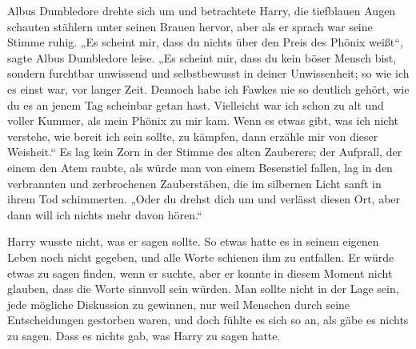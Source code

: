 Albus Dumbledore drehte sich um und betrachtete Harry, die tiefblauen Augen schauten stählern unter seinen Brauen hervor, aber als er sprach war seine Stimme ruhig. „Es scheint mir, dass du nichts über den Preis des Phönix weißt“, sagte Albus Dumbledore leise. „Es scheint mir, dass du kein böser Mensch bist, sondern furchtbar unwissend und selbstbewusst in deiner Unwissenheit; so wie ich es einst war, vor langer Zeit. Dennoch habe ich Fawkes nie so deutlich gehört, wie du es an jenem Tag scheinbar getan hast. Vielleicht war ich schon zu alt und voller Kummer, als mein Phönix zu mir kam. Wenn es etwas gibt, was ich nicht verstehe, wie bereit ich sein sollte, zu kämpfen, dann erzähle mir von dieser Weisheit.“ Es lag kein Zorn in der Stimme des alten Zauberers; der Aufprall, der einem den Atem raubte, als würde man von einem Besenstiel fallen, lag in den verbrannten und zerbrochenen Zauberstäben, die im silbernen Licht sanft in ihrem Tod schimmerten. „Oder du drehst dich um und verlässt diesen Ort, aber dann will ich nichts mehr davon hören.“

Harry wusste nicht, was er sagen sollte. So etwas hatte es in seinem eigenen Leben noch nicht gegeben, und alle Worte schienen ihm zu entfallen. Er würde etwas zu sagen finden, wenn er suchte, aber er konnte in diesem Moment nicht glauben, dass die Worte sinnvoll sein würden. Man sollte nicht in der Lage sein, jede mögliche Diskussion zu gewinnen, nur weil Menschen durch seine Entscheidungen gestorben waren, und doch fühlte es sich so an, als gäbe es nichts zu sagen. Dass es nichts gab, was Harry zu sagen hatte.


